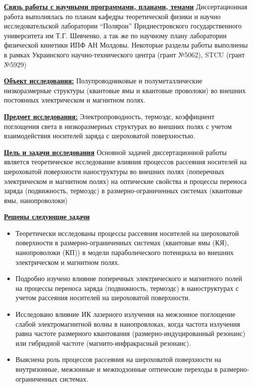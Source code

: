 \underline{\textbf{Связь работы с научными программами, планами, темами}}
Диссертационная работа выполнялась по планам кафедры теоретической физики и научно исследовательской лаборатории “Полярон” Приднестровского государственного университета им Т.Г. Шевченко, а так же по научному плану лаборатории физической кинетики ИПФ АН Молдовы. Некоторые разделы работы выполнены в рамках Украинского научно-технического центра (грант №5062), STCU (грант №5929)

\underline{\textbf{Объект исследования:}} Полупроводниковые и полуметаллические низкоразмерные структуры (квантовые ямы и квантовые проволоки) во внешних постоянных электрическом и магнитном полях.

\underline{\textbf{Предмет исследования:}} Электропроводность, термоэдс, коэффициент поглощения света в низкоразмерных структурах во внешних полях с учетом взаимодействия носителей заряда с шероховатой поверхностью.

\underline{\textbf{Цель и задачи исследования}}
Основной задачей диссертационной работы является теоретическое исследование влияния процессов рассеяния носителей на шероховатой поверхности наноструктуры во внешних полях (поперечных электрическом и магнитном полях) на оптические свойства и процессы переноса заряда (подвижность, термоэдс) в размерно-ограниченных системах (квантовые ямы, нанопроволоки)

\underline{\textbf{Решены следующие задачи}}
\begin{itemize}
	\item Теоретически исследованы процессы рассеяния носителей на шероховатой поверхности в размерно-ограниченных системах (квантовые ямы (КЯ), нанопроволоки (КП)) в модели параболического потенциала во внешних электрическом и магнитном полях.
	\item Подробно изучено влияние поперечных электрического и магнитного полей на процессы переноса заряда (подвижность, термоэдс) в наноструктурах с учетом рассеяния носителей на шероховатой поверхности.
	\item Исследовано влияние ИК лазерного излучения на межзонное поглощение слабой электромагнитной волны в нанопровлоках, когда частота излучения равна частоте размерного квантования (размерно-индуцированный резонанс) или гибридной частоте (магнито-инфракрасный резонанс).
	\item Выяснена роль процессов рассеяния на шероховатой поверхности на внутризонные, межзонные и межподзонные оптические переходы в размерно-ограниченных системах.
\end{itemize}

